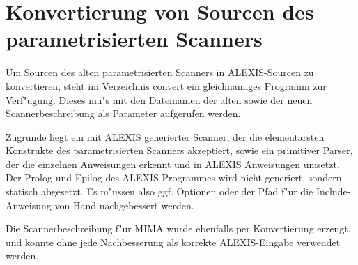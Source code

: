 \chapter{Konvertierung von Sourcen des parametrisierten Scanners}
Um Sourcen des alten parametrisierten Scanners in ALEXIS-Sourcen zu konvertieren,
steht im Verzeichnis convert ein gleichnamiges Programm zur Verf"ugung. Dieses mu"s
mit den Dateinamen der alten sowie der neuen Scannerbeschreibung als
Parameter aufgerufen werden.

Zugrunde liegt ein mit ALEXIS generierter Scanner, der die elementarsten Konstrukte
des parametrisierten Scanners akzeptiert, sowie ein primitiver Parser, der die
einzelnen Anweisungen erkennt und in ALEXIS Anweisungen umsetzt. Der Prolog und Epilog
des ALEXIS-Programmes wird nicht generiert, sondern statisch abgesetzt. Es m"ussen
also ggf. Optionen oder der Pfad f"ur die Include-Anweisung von Hand nachgebessert
werden. 

Die Scannerbeschreibung f"ur MIMA wurde ebenfalls per Konvertierung erzeugt,
und konnte ohne jede Nachbesserung als korrekte ALEXIS-Eingabe verwendet werden.  
